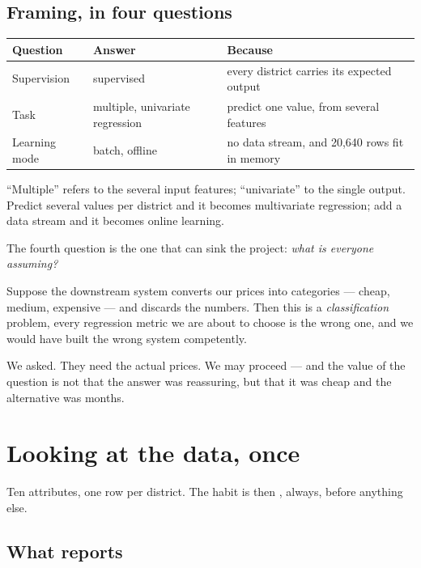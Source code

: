 \documentclass[11pt,a4paper]{article}
\begin{document}
\subsection{Framing, in four questions}

\begin{center}
\small
\begin{tabular}{llp{}}
\toprule
\textbf{Question} & \textbf{Answer} & \textbf{Because} \\
\midrule
Supervision   & supervised & every district carries its expected output \\
Task          & multiple, univariate regression & predict one value, from
                several features \\
Learning mode & batch, offline & no data stream, and 20{,}640 rows fit in
                memory \\
\bottomrule
\end{tabular}
\end{center}

``Multiple'' refers to the several input features; ``univariate'' to the single
output. Predict several values per district and it becomes multivariate
regression; add a data stream and it becomes online learning.

The fourth question is the one that can sink the project: \emph{what is
everyone assuming?}

\begin{failbox}[title={Failure condition --- the assumption that would have sunk this project}]
Suppose the downstream system converts our prices into categories --- cheap,
medium, expensive --- and discards the numbers. Then this is a
\emph{classification} problem, every regression metric we are about to choose
is the wrong one, and we would have built the wrong system competently.

We asked. They need the actual prices. We may proceed --- and the value of the
question is not that the answer was reassuring, but that it was cheap and the
alternative was months.
\end{failbox}

\section{Looking at the data, once}

Ten attributes, one row per district. The habit is  then
, always, before anything else.

\subsection{What  reports}
\end{document}
